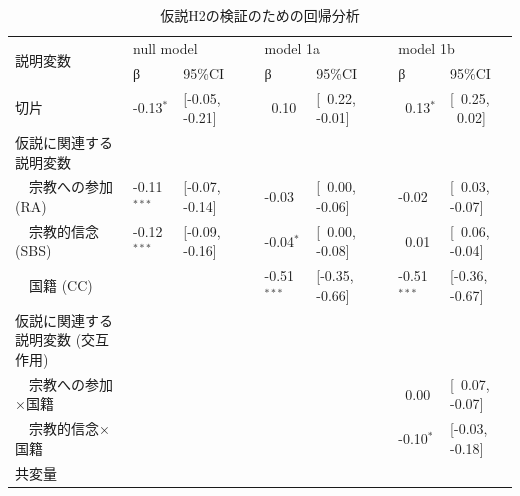 \documentclass[a4j,12pt]{jreport}
\begin{document}
\clearpage
\begin{table}[]
{\scriptsize
  \begin{threeparttable}
\caption{仮説H2の検証のための回帰分析}
\label{tab:Table_Regr}
\begin{tabular}{@{}lllllllll@{}}
\toprule
\multirow{2}{*}{説明変数}                & \multicolumn{2}{l}{null model}        &  & \multicolumn{2}{l}{model 1a}          &  & \multicolumn{2}{l}{model 1b}          \\ \cmidrule(lr){2-3} \cmidrule(lr){5-6} \cmidrule(l){8-9} 
                                          & β              & 95\%CI               &  & β              & 95\%CI               &  & β              & 95\%CI               \\ \midrule
切片                                 & -0.13$^*$  & {[}-0.05, -0.21{]}   &  & ~0.10         & {[}~0.22, -0.01{]}  &  & ~0.13$^*$ & {[}~0.25, ~0.02{]} \\
仮説に関連する説明変数                    &                &                      &  &                &                      &  &                &                      \\
~~宗教への参加 (RA)             & -0.11$^{***}$       & {[}-0.07, -0.14{]}   &  & -0.03          & {[}~0.00, -0.06{]}  &  & -0.02          & {[}~0.03, -0.07{]}  \\
~~宗教的信念 (SBS)            & -0.12$^{***}$       & {[}-0.09, -0.16{]}   &  & -0.04$^*$  & {[}~0.00, -0.08{]}  &  & ~0.01         & {[}~0.06, -0.04{]}  \\
~~国籍 (CC)           &                &                      &  & -0.51$^{***}$       & {[}-0.35, -0.66{]}   &  & -0.51$^{***}$       & {[}-0.36, -0.67{]}   \\
仮説に関連する説明変数   (交互作用)    &                &                      &  &                &                      &  &                &                      \\
~~宗教への参加×国籍                                 &                &                      &  &                &                      &  & ~0.00         & {[}~0.07, -0.07{]}  \\
~~宗教的信念×国籍                         &                &                      &  &                &                      &  & -0.10$^*$  & {[}-0.03, -0.18{]}   \\
共変量                               &                &                      &  &                &                      &  &                &                      \\

\end{tabular}
\end{threeparttable}}
\end{table}
\end{document}
